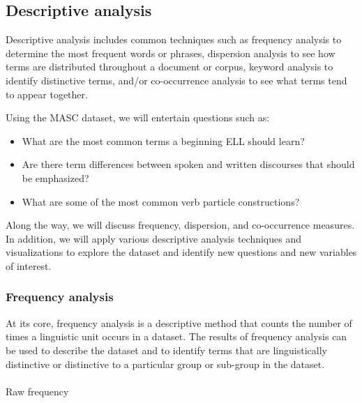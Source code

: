 \documentclass[
  letterpaper,
  krantz1]{latex/krantz-mod}
\makeatletter
\let\oldparagraph\paragraph
\renewcommand{\paragraph}{
    \@ifstar
      \xxxParagraphStar
      \xxxParagraphNoStar
  }
\newcommand{\xxxParagraphStar}[1]{\oldparagraph*{#1}\mbox{}}
\newcommand{\xxxParagraphNoStar}[1]{\oldparagraph{#1}\mbox{}}
\providecommand{\tightlist}{%
  \setlength{\itemsep}{0pt}\setlength{\parskip}{0pt}}\usepackage{longtable,booktabs,array}
\theoremstyle{definition}
\theoremstyle{definition}
\theoremstyle{remark}
\makeatother
\begin{document}
\subsection{Descriptive analysis}\label{sec-explore-descriptive}

Descriptive analysis includes common
techniques such as frequency analysis to
determine the most frequent words or phrases, dispersion
analysis to see how terms are distributed
throughout a document or corpus, keyword
analysis to identify distinctive terms, and/or
co-occurrence analysis to see what terms
tend to appear together.

Using the MASC dataset, we will entertain questions such as:

\begin{itemize}
\tightlist
\item
  What are the most common terms a beginning ELL should learn?
\item
  Are there term differences between spoken and written discourses that
  should be emphasized?
\item
  What are some of the most common verb particle constructions?
\end{itemize}

Along the way, we will discuss frequency, dispersion, and co-occurrence
measures. In addition, we will apply various descriptive analysis
techniques and visualizations to explore the dataset and identify new
questions and new variables of interest.

\subsubsection{Frequency analysis}\label{sec-explore-frequency}

At its core, frequency analysis is a
descriptive method that counts the number of times a linguistic
unit occurs in a dataset. The results of frequency analysis
can be used to describe the dataset and to identify terms that are
linguistically distinctive or distinctive to a particular group or
sub-group in the dataset.

\paragraph{Raw frequency}\label{sec-explore-frequency-raw}
\end{document}
